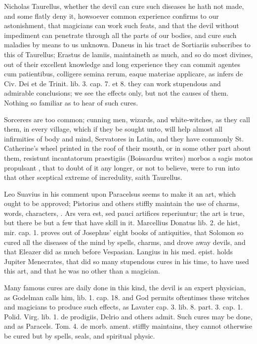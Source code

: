 {Nicholas Taurellus, whether the devil can cure such diseases he hath
not made, and some flatly deny it, howsoever common experience confirms
to our astonishment, that magicians can work such feats, and that the
devil without impediment can penetrate through all the parts of our
bodies, and cure such maladies by means to us unknown. Daneus in his
tract de Sortiariis subscribes to this of Taurellus; Erastus de lamiis,
maintaineth as much, and so do most divines, out of their excellent
knowledge and long experience they can commit agentes cum
patientibus, colligere semina rerum, eaque materiae applicare, as
\Austin{} infers de Civ. Dei et de Trinit. lib. 3. cap. 7. et 8. they can
work stupendous and admirable conclusions; we see the effects only, but
not the causes of them. Nothing so familiar as to hear of such cures.

Sorcerers are too common; cunning men, wizards, and white-witches, as
they call them, in every village, which if they be sought unto, will
help almost all infirmities of body and mind, Servatores in Latin, and
they have commonly St. Catherine's wheel printed in the roof of their
mouth, or in some other part about them, resistunt incantatorum
praestigiis (Boissardus writes) morbos a sagis motos propulsant
\etc{}, that to doubt of it any longer, or not to believe, were to
run into that other sceptical extreme of incredulity, saith Taurellus.

Leo Suavius in his comment upon Paracelsus seems to make it an art,
which ought to be approved; Pistorius and others stiffly maintain the
use of charms, words, characters, \etc{}. Ars vera est, sed pauci artifices
reperiuntur; the art is true, but there be but a few that have skill in
it. Marcellius Donatus lib. 2. de hist, mir. cap. 1. proves out of
Josephus' eight books of antiquities, that Solomon so cured all
the diseases of the mind by spells, charms, and drove away devils, and
that Eleazer did as much before Vespasian. Langius in his med. epist.
holds Jupiter Menecrates, that did so many stupendous cures in his
time, to have used this art, and that he was no other than a magician.

Many famous cures are daily done in this kind, the devil is an expert
physician, as Godelman calls him, lib. 1. cap. 18. and God permits
oftentimes these witches and magicians to produce such effects, as
Lavater cap. 3. lib. 8. part. 3. cap. 1. Polid. Virg. lib. 1. de
prodigiis, Delrio and others admit. Such cures may be done, and as
Paracels. Tom. 4. de morb. ament. stiffly maintains, they cannot
otherwise be cured but by spells, seals, and spiritual physic.

}
